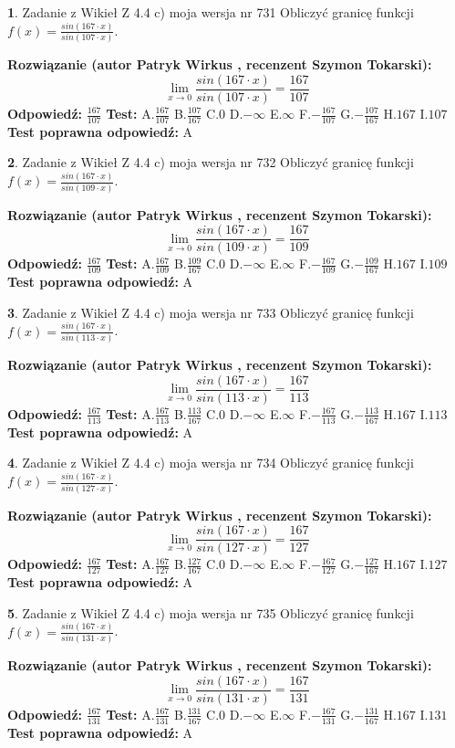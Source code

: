 \documentclass[12pt, a4paper]{article}
\theoremstyle{definition} %
\newtheorem{zad}{}
\newcommand{\zadStart}[1]{\begin{zad}#1\newline}
\newcommand{\zadStop}{\end{zad}}
\newcommand{\rozwStart}[2]{\noindent \textbf{Rozwiązanie (autor #1 , recenzent #2): }\newline}
\newcommand{\rozwStop}{\newline}
\newcommand{\odpStart}{\noindent \textbf{Odpowiedź:}\newline}
\newcommand{\odpStop}{\newline}
\newcommand{\testStart}{\noindent \textbf{Test:}\newline}
\newcommand{\testStop}{\newline}
\newcommand{\kluczStart}{\noindent \textbf{Test poprawna odpowiedź:}\newline}
\newcommand{\kluczStop}{\newline}
\begin{document}
\zadStart{Zadanie z Wikieł Z 4.4 c) moja wersja nr 731}
Obliczyć granicę funkcji $f(x)=\frac{sin(167\cdot x)}{sin(107\cdot x)}$.
\zadStop
\rozwStart{Patryk Wirkus}{Szymon Tokarski}
$$\lim\limits_{x\to 0}\frac{sin(167\cdot x)}{sin(107\cdot x)}=
\frac{167}{107}$$
\rozwStop
\odpStart
$\frac{167}{107}$
\odpStop
\testStart
A.$\frac{167}{107}$
B.$\frac{107}{167}$
C.$0$
D.$-\infty$
E.$\infty$
F.$-\frac{167}{107}$
G.$-\frac{107}{167}$
H.$167$
I.$107$
\testStop
\kluczStart
A
\kluczStop



\zadStart{Zadanie z Wikieł Z 4.4 c) moja wersja nr 732}
Obliczyć granicę funkcji $f(x)=\frac{sin(167\cdot x)}{sin(109\cdot x)}$.
\zadStop
\rozwStart{Patryk Wirkus}{Szymon Tokarski}
$$\lim\limits_{x\to 0}\frac{sin(167\cdot x)}{sin(109\cdot x)}=
\frac{167}{109}$$
\rozwStop
\odpStart
$\frac{167}{109}$
\odpStop
\testStart
A.$\frac{167}{109}$
B.$\frac{109}{167}$
C.$0$
D.$-\infty$
E.$\infty$
F.$-\frac{167}{109}$
G.$-\frac{109}{167}$
H.$167$
I.$109$
\testStop
\kluczStart
A
\kluczStop



\zadStart{Zadanie z Wikieł Z 4.4 c) moja wersja nr 733}
Obliczyć granicę funkcji $f(x)=\frac{sin(167\cdot x)}{sin(113\cdot x)}$.
\zadStop
\rozwStart{Patryk Wirkus}{Szymon Tokarski}
$$\lim\limits_{x\to 0}\frac{sin(167\cdot x)}{sin(113\cdot x)}=
\frac{167}{113}$$
\rozwStop
\odpStart
$\frac{167}{113}$
\odpStop
\testStart
A.$\frac{167}{113}$
B.$\frac{113}{167}$
C.$0$
D.$-\infty$
E.$\infty$
F.$-\frac{167}{113}$
G.$-\frac{113}{167}$
H.$167$
I.$113$
\testStop
\kluczStart
A
\kluczStop



\zadStart{Zadanie z Wikieł Z 4.4 c) moja wersja nr 734}
Obliczyć granicę funkcji $f(x)=\frac{sin(167\cdot x)}{sin(127\cdot x)}$.
\zadStop
\rozwStart{Patryk Wirkus}{Szymon Tokarski}
$$\lim\limits_{x\to 0}\frac{sin(167\cdot x)}{sin(127\cdot x)}=
\frac{167}{127}$$
\rozwStop
\odpStart
$\frac{167}{127}$
\odpStop
\testStart
A.$\frac{167}{127}$
B.$\frac{127}{167}$
C.$0$
D.$-\infty$
E.$\infty$
F.$-\frac{167}{127}$
G.$-\frac{127}{167}$
H.$167$
I.$127$
\testStop
\kluczStart
A
\kluczStop



\zadStart{Zadanie z Wikieł Z 4.4 c) moja wersja nr 735}
Obliczyć granicę funkcji $f(x)=\frac{sin(167\cdot x)}{sin(131\cdot x)}$.
\zadStop
\rozwStart{Patryk Wirkus}{Szymon Tokarski}
$$\lim\limits_{x\to 0}\frac{sin(167\cdot x)}{sin(131\cdot x)}=
\frac{167}{131}$$
\rozwStop
\odpStart
$\frac{167}{131}$
\odpStop
\testStart
A.$\frac{167}{131}$
B.$\frac{131}{167}$
C.$0$
D.$-\infty$
E.$\infty$
F.$-\frac{167}{131}$
G.$-\frac{131}{167}$
H.$167$
I.$131$
\testStop
\kluczStart
A
\kluczStop
\end{document}
